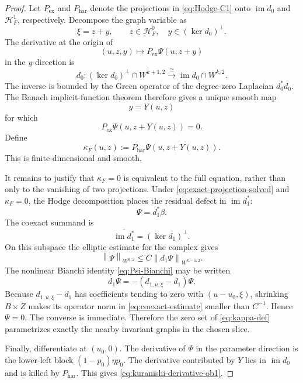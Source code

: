 \documentclass[11pt,reqno]{amsart}
\theoremstyle{definition}
\theoremstyle{remark}
\newcommand{\cH}{\mathcal H}
\newcommand{\im}{\operatorname{im}}
\newcommand{\norm}[1]{\left\lVert #1\right\rVert}
\begin{document}
\begin{proof}
Let $P_{\mathrm{ex}}$ and $P_{\mathrm{har}}$ denote the projections in \eqref{eq:Hodge-C1} onto $\im d_0$ and $\cH^1_F$, respectively.  Decompose the graph variable as
\[
  \xi=z+y,
  \qquad
  z\in\cH^0_F,
  \quad
  y\in(\ker d_0)^\perp.
\]
The derivative at the origin of
\[
  (u,z,y)\longmapsto P_{\mathrm{ex}}\Psi(u,z+y)
\]
in the $y$-direction is
\[
  d_0:(\ker d_0)^\perp\cap W^{k+1,2}
  \xrightarrow{\;\cong\;}
  \im d_0\cap W^{k,2}.
\]
The inverse is bounded by the Green operator of the degree-zero Laplacian $d_0^*d_0$.  The Banach implicit-function theorem therefore gives a unique smooth map
\[
  y=Y(u,z)
\]
for which
\begin{equation}\label{eq:exact-projection-solved}
  P_{\mathrm{ex}}\Psi(u,z+Y(u,z))=0.
\end{equation}
Define
\begin{equation}\label{eq:kappa-def}
  \kappa_F(u,z)
  :=P_{\mathrm{har}}\Psi(u,z+Y(u,z)).
\end{equation}
This is finite-dimensional and smooth.

It remains to justify that $\kappa_F=0$ is equivalent to the full equation, rather than only to the vanishing of two projections.  Under \eqref{eq:exact-projection-solved} and $\kappa_F=0$, the Hodge decomposition places the residual defect in $\im d_1^*$:
\[
  \Psi=d_1^*\beta.
\]
The coexact summand is
\[
  \overline{\im d_1^*}=(\ker d_1)^\perp.
\]
On this subspace the elliptic estimate for the complex gives
\begin{equation}\label{eq:coexact-estimate}
  \norm{\Psi}_{W^{k,2}}
  \le C\norm{d_1\Psi}_{W^{k-1,2}}.
\end{equation}
The nonlinear Bianchi identity \eqref{eq:Psi-Bianchi} may be written
\[
  d_1\Psi=-(d_{1,u,\xi}-d_1)\Psi.
\]
Because $d_{1,u,\xi}-d_1$ has coefficients tending to zero with $(u-u_0,\xi)$, shrinking $B\times Z$ makes its operator norm in \eqref{eq:coexact-estimate} smaller than $C^{-1}$.  Hence $\Psi=0$.  The converse is immediate.  Therefore the zero set of \eqref{eq:kappa-def} parametrizes exactly the nearby invariant graphs in the chosen slice.

Finally, differentiate at $(u_0,0)$.  The derivative of $\Psi$ in the parameter direction is the lower-left block $(1-p_0)\eta p_0$.  The derivative contributed by $Y$ lies in $\im d_0$ and is killed by $P_{\mathrm{har}}$.  This gives \eqref{eq:kuranishi-derivative-ob1}.
\end{proof}
\end{document}
